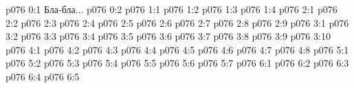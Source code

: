\author{Солония}
\vs p076 0:1  Бла-бла...
\vs p076 0:2 \pc 
{}
\vs p076 1:1 
\vs p076 1:2 
\vs p076 1:3 
\vs p076 1:4 \pc 
{}
\vs p076 2:1 
\vs p076 2:2 
\vs p076 2:3 
\vs p076 2:4 
\vs p076 2:5 
\vs p076 2:6 \pc 
\vs p076 2:7 \pc 
\vs p076 2:8 
\vs p076 2:9 
\vs p076 3:1 
\vs p076 3:2 
\vs p076 3:3 \pc 
\vs p076 3:4 \pc 
\vs p076 3:5 
\vs p076 3:6 \pc 
\vs p076 3:7 
\vs p076 3:8 \pc 
\vs p076 3:9 
\vs p076 3:10 
\vs p076 4:1 
\vs p076 4:2 
\vs p076 4:3 
\vs p076 4:4 
\vs p076 4:5 
\vs p076 4:6 
\vs p076 4:7 
\vs p076 4:8 \pc 
{}
\vs p076 5:1 
\vs p076 5:2 
\vs p076 5:3 \pc 
\vs p076 5:4 
\vs p076 5:5 \pc 
\vs p076 5:6 \pc 
\vs p076 5:7 
\vs p076 6:1 
\vs p076 6:2 
\vs p076 6:3 \pc 
\vs p076 6:4 \pc 
\vsetoff
\vs p076 6:5 
\quizlink
